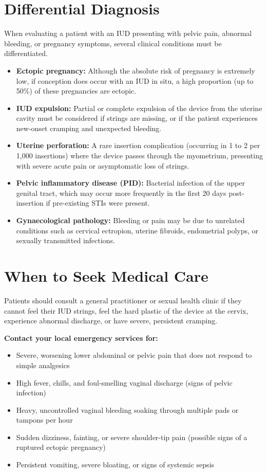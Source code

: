 \section*{Differential Diagnosis}
When evaluating a patient with an IUD presenting with pelvic pain, abnormal bleeding, or pregnancy symptoms, several clinical conditions must be differentiated.
\begin{itemize}
    \item \textbf{Ectopic pregnancy:} Although the absolute risk of pregnancy is extremely low, if conception does occur with an IUD in situ, a high proportion (up to 50\%) of these pregnancies are ectopic.
    \item \textbf{IUD expulsion:} Partial or complete expulsion of the device from the uterine cavity must be considered if strings are missing, or if the patient experiences new-onset cramping and unexpected bleeding.
    \item \textbf{Uterine perforation:} A rare insertion complication (occurring in 1 to 2 per 1,000 insertions) where the device passes through the myometrium, presenting with severe acute pain or asymptomatic loss of strings.
    \item \textbf{Pelvic inflammatory disease (PID):} Bacterial infection of the upper genital tract, which may occur more frequently in the first 20 days post-insertion if pre-existing STIs were present.
    \item \textbf{Gynaecological pathology:} Bleeding or pain may be due to unrelated conditions such as cervical ectropion, uterine fibroids, endometrial polyps, or sexually transmitted infections.
\end{itemize}

\section*{When to Seek Medical Care}
Patients should consult a general practitioner or sexual health clinic if they cannot feel their IUD strings, feel the hard plastic of the device at the cervix, experience abnormal discharge, or have severe, persistent cramping.

\textbf{Contact your local emergency services for:}
\begin{itemize}
    \item Severe, worsening lower abdominal or pelvic pain that does not respond to simple analgesics
    \item High fever, chills, and foul-smelling vaginal discharge (signs of pelvic infection)
    \item Heavy, uncontrolled vaginal bleeding soaking through multiple pads or tampons per hour
    \item Sudden dizziness, fainting, or severe shoulder-tip pain (possible signs of a ruptured ectopic pregnancy)
    \item Persistent vomiting, severe bloating, or signs of systemic sepsis
\end{itemize}

